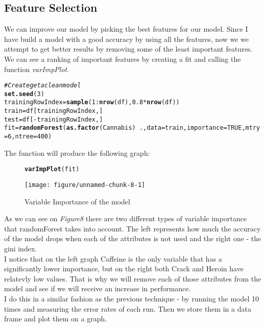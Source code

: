 \documentclass{article}\usepackage[]{graphicx}\usepackage[]{color}
\makeatletter
\newcommand{\hlnum}[1]{\textcolor[rgb]{0.686,0.059,0.569}{#1}}%
\newcommand{\hlcom}[1]{\textcolor[rgb]{0.678,0.584,0.686}{\textit{#1}}}%
\newcommand{\hlopt}[1]{\textcolor[rgb]{0,0,0}{#1}}%
\newcommand{\hlstd}[1]{\textcolor[rgb]{0.345,0.345,0.345}{#1}}%
\newcommand{\hlkwb}[1]{\textcolor[rgb]{0.69,0.353,0.396}{#1}}%
\newcommand{\hlkwc}[1]{\textcolor[rgb]{0.333,0.667,0.333}{#1}}%
\newcommand{\hlkwd}[1]{\textcolor[rgb]{0.737,0.353,0.396}{\textbf{#1}}}%
\newenvironment{kframe}{%
 \def\at@end@of@kframe{}%
 \ifinner\ifhmode%
  \def\at@end@of@kframe{\end{minipage}}%
  \begin{minipage}{\columnwidth}%
 \fi\fi%
 \def\FrameCommand##1{\hskip\@totalleftmargin \hskip-\fboxsep
 \colorbox{shadecolor}{##1}\hskip-\fboxsep
     \hskip-\linewidth \hskip-\@totalleftmargin \hskip\columnwidth}%
 \MakeFramed {\advance\hsize-\width
   \@totalleftmargin\z@ \linewidth\hsize
   \@setminipage}}%
 {\par\unskip\endMakeFramed%
 \at@end@of@kframe}
\newenvironment{knitrout}{}{} %
\makeatother
\begin{document}
\begin{itemize}
\subsection{Feature Selection}
We can improve our model by picking the best features for our model. Since I have build a model with a good accuracy by using all the features, now we we attempt to get better results by removing some of the least important features.
We can see a ranking of important features by creating a fit and calling the function \textit{varImpPlot}.
\begin{knitrout}
\color{fgcolor}\begin{kframe}
\begin{alltt}
\hlcom{#Create get a clean model}
\hlkwd{set.seed}\hlstd{(}\hlnum{3}\hlstd{)}
\hlstd{trainingRowIndex} \hlkwb{=} \hlkwd{sample}\hlstd{(}\hlnum{1}\hlopt{:}\hlkwd{nrow}\hlstd{(df),} \hlnum{0.8}\hlopt{*}\hlkwd{nrow}\hlstd{(df))}
\hlstd{train} \hlkwb{=} \hlstd{df[trainingRowIndex,]}
\hlstd{test} \hlkwb{=} \hlstd{df[}\hlopt{-}\hlstd{trainingRowIndex,]}
\hlstd{fit} \hlkwb{=} \hlkwd{randomForest}\hlstd{(}\hlkwd{as.factor}\hlstd{(Cannabis)}\hlopt{~}\hlstd{.,} \hlkwc{data}\hlstd{=train,} \hlkwc{importance} \hlstd{=} \hlnum{TRUE}\hlstd{,} \hlkwc{mtry}\hlstd{=}\hlnum{6}\hlstd{,} \hlkwc{ntree}\hlstd{=}\hlnum{400}\hlstd{)}
\end{alltt}
\end{kframe}
\end{knitrout}

The function will produce the following graph:
\begin {figure}[H]
\begin {center}
\begin{knitrout}
\color{fgcolor}\begin{kframe}
\begin{alltt}
\hlkwd{varImpPlot}\hlstd{(fit)}
\end{alltt}
\end{kframe}
\texttt{[image: figure/unnamed-chunk-8-1]} 

\end{knitrout}
\caption {Variable Importance of the model}
\label{fig8}
\end {center}
\end {figure}

As we can see on \textit{Figure8} there are two different types of variable importance that randomForest takes into account. The left represents how much the accuracy of the model drops when each of the attributes is not used and the right one - the gini index.
\\
I notice that on the left  graph Caffeine is the only variable that has a significantly lower importance, but on the right both Crack and Heroin have relatevly low values. That is why we will remove each of those attributes from the model and see if we will receive an increase in performance.
\\
I do this in a similar fashion as the previous technique - by running the model 10 times and measuring the error rates of each run. Then we store them in a data frame and plot them on a graph. 


\end{itemize}
\end{document}
